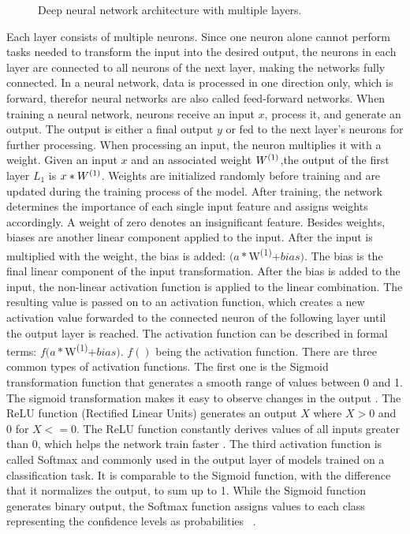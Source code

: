 \begin{figure}
\begin{tikzpicture}[x=0.75pt,y=0.75pt,yscale=-1.5,xscale=1.5]
\end{tikzpicture}

\caption[A DNN architecture with multiple layers]{Deep neural network architecture with multiple layers.}
\label{fig:DNN}
\end{figure}

Each layer consists of multiple neurons. Since one neuron alone cannot perform tasks needed to transform the input into the desired output, the neurons in each layer are connected to all neurons of the next layer, making the networks fully connected. In a neural network, data is processed in one direction only, which is forward, therefor neural networks are also called feed-forward networks. When training a neural network, neurons receive an input $x$, process it, and generate an output. The output is either a final output $y$ or fed to the next layer's neurons for further processing. When processing an input, the neuron multiplies it with a weight. Given an input $x$ and an associated weight $W\textsuperscript{(1)}$,the output of the first layer $L_1$ is $x*W\textsuperscript{(1)}$. Weights are initialized randomly before training and are updated during the training process of the model. After training, the network determines the importance of each single input feature and assigns weights accordingly. A weight of zero denotes an insignificant feature. Besides weights, biases are another linear component applied to the input. After the input is multiplied with the weight, the bias is added: $(a*$W\textsuperscript{(1)}$+bias)$. 
The bias is the final linear component of the input transformation. After the bias is added to the input, the non-linear activation function is applied to the linear combination. 
The resulting value is passed on to an activation function, which creates a new activation value forwarded to the connected neuron of the following layer until the output layer is reached. The activation function can be described in formal terms: 
$f(a*$W\textsuperscript{(1)}$+bias)$.  $f()$ being the activation function.
There are three common types of activation functions. The first one is the Sigmoid transformation function that generates a smooth range of values between 0 and 1. The sigmoid transformation makes it easy to observe changes in the output \cite{han1995influence}. The ReLU function (Rectified Linear Units) generates an output $X$ where $X>0$ and 0 for $X<= 0$. The ReLU function constantly derives values of all inputs greater than 0, which helps the network train faster \cite{glorot2011deep}. 
The third activation function is called Softmax and commonly used in the output layer of models trained on a classification task. It is comparable to the Sigmoid function, with the difference that it normalizes the output, to sum up to 1. While the Sigmoid function generates binary output, the Softmax function assigns values to each class representing the confidence levels as probabilities ~\protect\cite{jang2016categorical}.

